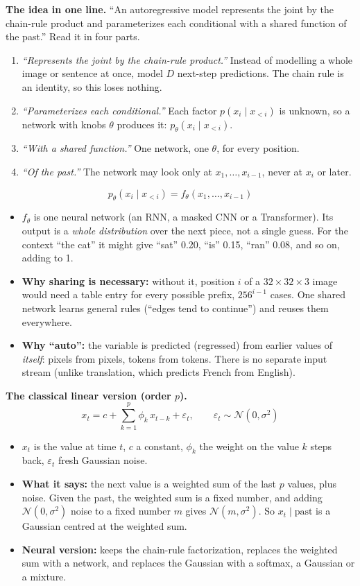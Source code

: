 \documentclass[12pt,a4paper]{article}
\begin{document}
\textbf{The idea in one line.} ``An autoregressive model represents the joint by the chain-rule product and parameterizes each conditional with a shared function of the past.'' Read it in four parts.
\begin{enumerate}[nosep]
  \item \emph{``Represents the joint by the chain-rule product.''} Instead of modelling a whole image or sentence at once, model $D$ next-step predictions. The chain rule is an identity, so this loses nothing.
  \item \emph{``Parameterizes each conditional.''} Each factor $p(x_i\mid x_{<i})$ is unknown, so a network with knobs $\theta$ produces it: $p_\theta(x_i\mid x_{<i})$.
  \item \emph{``With a shared function.''} One network, one $\theta$, for every position.
  \item \emph{``Of the past.''} The network may look only at $x_1,\dots,x_{i-1}$, never at $x_i$ or later.
\end{enumerate}
\[
p_\theta(x_i\mid x_{<i})=f_\theta(x_1,\dots,x_{i-1})
\]
\begin{itemize}[nosep]
  \item $f_\theta$ is one neural network (an RNN, a masked CNN or a Transformer). Its output is a \emph{whole distribution} over the next piece, not a single guess. For the context ``the cat'' it might give ``sat'' 0.20, ``is'' 0.15, ``ran'' 0.08, and so on, adding to 1.
  \item \textbf{Why sharing is necessary:} without it, position $i$ of a $32\times32\times3$ image would need a table entry for every possible prefix, $256^{i-1}$ cases. One shared network learns general rules (``edges tend to continue'') and reuses them everywhere.
  \item \textbf{Why ``auto'':} the variable is predicted (regressed) from earlier values of \emph{itself}: pixels from pixels, tokens from tokens. There is no separate input stream (unlike translation, which predicts French from English).
\end{itemize}

\textbf{The classical linear version (order $p$).}
\[
x_t=c+\sum_{k=1}^{p}\phi_k\,x_{t-k}+\varepsilon_t,\qquad\varepsilon_t\sim\mathcal{N}(0,\sigma^2)
\]
\begin{itemize}[nosep]
  \item $x_t$ is the value at time $t$, $c$ a constant, $\phi_k$ the weight on the value $k$ steps back, $\varepsilon_t$ fresh Gaussian noise.
  \item \textbf{What it says:} the next value is a weighted sum of the last $p$ values, plus noise. Given the past, the weighted sum is a fixed number, and adding $\mathcal{N}(0,\sigma^2)$ noise to a fixed number $m$ gives $\mathcal{N}(m,\sigma^2)$. So $x_t\mid\text{past}$ is a Gaussian centred at the weighted sum.
  \item \textbf{Neural version:} keeps the chain-rule factorization, replaces the weighted sum with a network, and replaces the Gaussian with a softmax, a Gaussian or a mixture.
\end{itemize}
\end{document}
